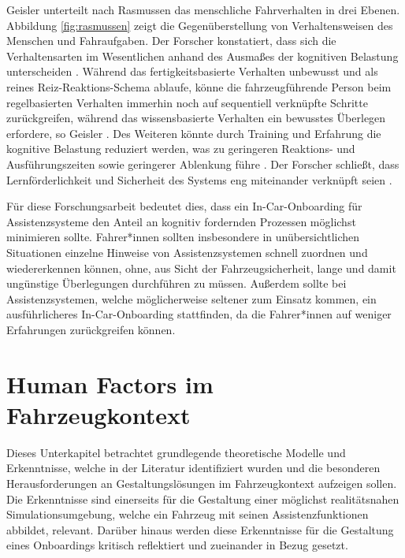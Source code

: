 Geisler \cite{Geisler_hci2021} unterteilt nach Rasmussen \cite{Rasmussen1983} das menschliche Fahrverhalten in drei Ebenen. Abbildung \ref{fig:rasmussen} zeigt die Gegenüberstellung von Verhaltensweisen des Menschen und Fahraufgaben. Der Forscher konstatiert, dass sich die Verhaltensarten im Wesentlichen anhand des Ausmaßes der kognitiven Belastung unterscheiden \cite{Geisler_hci2021}. Während das fertigkeitsbasierte Verhalten unbewusst und als reines Reiz-Reaktions-Schema ablaufe, könne die fahrzeugführende Person beim regelbasierten Verhalten immerhin noch auf sequentiell verknüpfte Schritte zurückgreifen, während das wissensbasierte Verhalten ein bewusstes Überlegen erfordere, so Geisler \cite{Geisler_hci2021}. Des Weiteren könnte durch Training und Erfahrung die kognitive Belastung reduziert werden, was zu geringeren Reaktions- und Ausführungszeiten sowie geringerer Ablenkung führe \cite{Geisler_hci2021}. Der Forscher schließt, dass Lernförderlichkeit und Sicherheit des Systems eng miteinander verknüpft seien \cite{Geisler_hci2021}.

Für diese Forschungsarbeit bedeutet dies, dass ein In-Car-Onboarding für Assistenzsysteme den Anteil an kognitiv fordernden Prozessen möglichst minimieren sollte. Fahrer*innen sollten insbesondere in unübersichtlichen Situationen einzelne Hinweise von Assistenzsystemen schnell zuordnen und wiedererkennen können, ohne, aus Sicht der Fahrzeugsicherheit, lange und damit ungünstige Überlegungen durchführen zu müssen. Außerdem sollte bei Assistenzsystemen, welche möglicherweise seltener zum Einsatz kommen, ein ausführlicheres In-Car-Onboarding stattfinden, da die Fahrer*innen auf weniger Erfahrungen zurückgreifen können.  

\section{Human Factors im Fahrzeugkontext}
\label{sec:human_factors}
Dieses Unterkapitel betrachtet grundlegende theoretische Modelle und Erkenntnisse, welche in der Literatur \cite{Geisler_hci2021,Geisler_autonom2021} identifiziert wurden und die besonderen Herausforderungen an Gestaltungslösungen im Fahrzeugkontext aufzeigen sollen. Die Erkenntnisse sind einerseits für die Gestaltung einer möglichst realitätsnahen Simulationsumgebung, welche ein Fahrzeug mit seinen Assistenzfunktionen abbildet, relevant. Darüber hinaus werden diese Erkenntnisse für die Gestaltung eines Onboardings kritisch reflektiert und zueinander in Bezug gesetzt.

